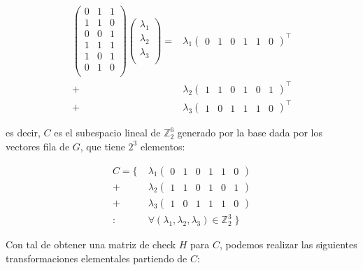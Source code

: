 \documentclass{article}
\begin{document}
\begin{align*}
  \begin{pmatrix} 
    0 & 1 & 1 \\
    1 & 1 & 0 \\
    0 & 0 & 1 \\
    1 & 1 & 1 \\
    1 & 0 & 1 \\
    0 & 1 & 0 \\
  \end{pmatrix}
  \begin{pmatrix} 
    \lambda_1 \\  
    \lambda_2 \\ 
    \lambda_3 \\ 
  \end{pmatrix}
  = &\lambda_1 \begin{pmatrix}
    0 & 1 & 0 & 1 & 1 & 0 
  \end{pmatrix}^\top \\
  + &\lambda_2 \begin{pmatrix} 
    1 & 1 & 0 & 1 & 0 & 1 
  \end{pmatrix}^\top \\
  + &\lambda_3 \begin{pmatrix} 
    1 & 0 & 1 & 1 & 1 & 0 
  \end{pmatrix}^\top
\end{align*}

es decir, $C$ es el subespacio lineal de $\mathbb{Z}_2^6$ generado
por la base dada por los vectores fila de $G$, que tiene $2^3$
elementos:

\begin{align*}
  C = \{\;
    &\lambda_1 \begin{pmatrix} 
      0 & 1 & 0 & 1 & 1 & 0 
    \end{pmatrix} \\
    + &\lambda_2 \begin{pmatrix}
      1 & 1 & 0 & 1 & 0 & 1 
    \end{pmatrix} \\ 
    + &\lambda_3 \begin{pmatrix} 
      1 & 0 & 1 & 1 & 1 & 0 
    \end{pmatrix} \\
    :\;&\forall (\lambda_1, \lambda_2, \lambda_3) 
      \in \mathbb{Z}_2^3
  \;\}
\end{align*}

Con tal de obtener una matriz de check $H$ para $C$, podemos
realizar las siguientes transformaciones elementales partiendo de
$C$:
\end{document}

